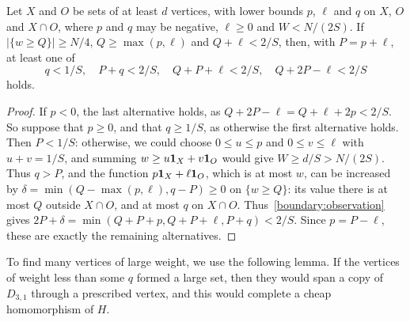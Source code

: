 \begin{lemma}
\label{boundary391:counts:3}
\label{intersectiontail:count}\label{intersectiontail:disjunction}
Let $X$ and $O$ be sets of at least $d$ vertices, with lower bounds
$p$, $\ell$ and $q$ on $X$, $O$ and $X\cap O$, where $p$ and $q$ may be negative,
$\ell\ge0$ and $W<N/(2S)$.
If $|\{w\ge Q\}|\ge N/4$, $Q\ge\max(p,\ell)$ and
$Q+\ell<2/S$, then, with $P=p+\ell$, at least one of
\begin{equation}\label{intersectiontail:four-branches}
 q<1/S,\quad P+q<2/S,\quad Q+P+\ell<2/S,
 \quad Q+2P-\ell<2/S
\end{equation}
holds.
\end{lemma}
\begin{proof}
If $p<0$, the last alternative holds, as $Q+2P-\ell=Q+\ell+2p<2/S$.
So suppose that $p\ge0$, and that $q\ge1/S$, as otherwise the first alternative holds. Then $P<1/S$:
otherwise, we could choose $0\le u\le p$ and $0\le v\le\ell$ with
$u+v=1/S$, and summing $w\ge u\mathbf 1_X+v\mathbf 1_O$ would give $W\ge d/S>N/(2S)$.
Thus $q>P$, and the function $p\mathbf 1_X+\ell\mathbf 1_O$, which is at most $w$, can be increased by $\delta=\min(Q-\max(p,\ell),q-P)\ge0$ on $\{w\ge Q\}$: its value there is at most $Q$ outside
$X\cap O$, and at most $q$ on $X\cap O$.
Thus~\eqref{boundary:observation} gives $2P+\delta =\min(Q+P+p,Q+P+\ell,P+q)<2/S$. Since $p=P-\ell$, these are exactly the remaining alternatives.
\end{proof}

To find many vertices of large weight, we use the following lemma. If the vertices of weight less than some $q$ formed a large set, then they would span a copy of $D_{3,1}$ through a prescribed vertex, and this would complete a cheap homomorphism of $H$.

